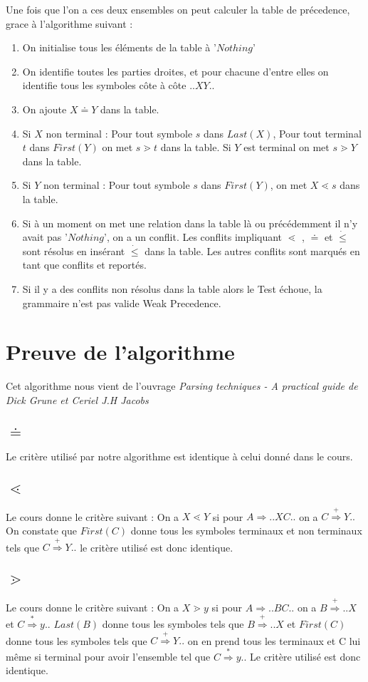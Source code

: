 		Une fois que l'on a ces deux ensembles on peut calculer la table de précedence, grace à l'algorithme suivant :
		\begin{enumerate}
			\item On initialise tous les éléments de la table à '$Nothing$'
			\item On identifie toutes les parties droites, et pour chacune d'entre elles on identifie tous les
			symboles côte à côte $..XY..$
			\item On ajoute $X\doteq Y$ dans la table.
			\item Si $X$ non terminal : Pour tout symbole $s$ dans $Last(X)$, Pour tout terminal $t$ dans $First(Y)$
				on met $s\gtrdot t$ dans la table. Si $Y$ est terminal on met $s\gtrdot Y$ dans la table.
			\item Si $Y$ non terminal : Pour tout symbole $s$ dans $First(Y)$, on met $X \lessdot s$ dans la table.
			\item Si à un moment on met une relation dans la table là ou précédemment il n'y avait pas '$Nothing$',
				on a un conflit. Les conflits impliquant $\lessdot$ , $\doteq$ et $\dot{\leq}$ sont résolus en insérant $\dot{\leq}$ dans
				la table. Les autres conflits sont marqués en tant que conflits et reportés. 
			\item Si il y a des conflits non résolus dans la table alors le Test échoue, la grammaire n'est pas valide
			Weak Precedence.
		\end{enumerate}
	\section{Preuve de l'algorithme}
		Cet algorithme nous vient de l'ouvrage \emph{Parsing techniques - A practical guide de Dick Grune et Ceriel J.H Jacobs}
		\subsection{$\doteq$} Le critère utilisé par notre algorithme est identique à celui donné dans le cours.
		\subsection{$\lessdot$} Le cours donne le critère suivant : On a $X\lessdot Y$ si pour $A \Longrightarrow..XC..$ on a $C \overset{+}{\Longrightarrow} Y..$ On constate
		que $First(C)$ donne tous les symboles terminaux et non terminaux tels que $C \overset{+}{\Longrightarrow} Y..$ le critère utilisé est donc
		identique.
		\subsection{$\gtrdot$} Le cours donne le critère suivant : On a $X\gtrdot y$ si pour $A\Longrightarrow..BC..$ on 
		a $B \overset{+}{\Longrightarrow} ..X$ et $C \overset{*}{\Longrightarrow} y..$
		$Last(B)$ donne tous les symboles tels que $B \overset{+}{\Longrightarrow}..X$ et $First(C)$ donne tous les symboles tels que 
		$C \overset{+}{\Longrightarrow} Y..$ 
		on en prend tous les terminaux et C lui même si terminal pour avoir l'ensemble tel que $C \overset{*}{\Longrightarrow} y..$ Le critère utilisé
		est donc identique. 

